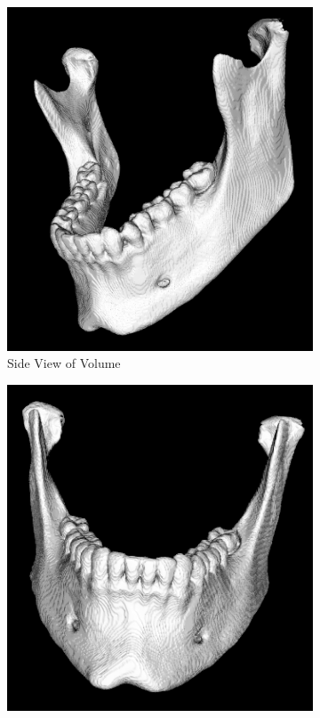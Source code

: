 \documentclass[11.5pt, b5paper]{article}
\begin{document}
\begin{figure}
    \centering
    \begin{subfigure}[b]{0.33\textwidth}
        \centering
        \includegraphics[width=\textwidth]{MCS}
        \caption{Side View of Volume}
    \end{subfigure}
    \hfill
    \begin{subfigure}[b]{0.33\textwidth}
        \centering
        \includegraphics[width=\textwidth]{MCF}

\end{subfigure}
\end{figure}
\end{document}

